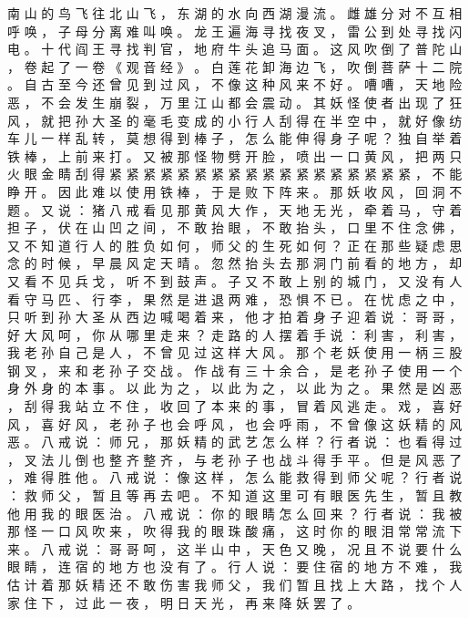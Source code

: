{南 山 的 鸟 飞 往 北 山 飞 ， 东 湖 的 水 向 西 湖 漫 流 。
雌 雄 分 对 不 互 相 呼 唤 ， 子 母 分 离 难 叫 唤 。
龙 王 遍 海 寻 找 夜 叉 ， 雷 公 到 处 寻 找 闪 电 。
十 代 阎 王 寻 找 判 官 ， 地 府 牛 头 追 马 面 。
这 风 吹 倒 了 普 陀 山 ， 卷 起 了 一 卷 《 观 音 经 》 。
白 莲 花 卸 海 边 飞 ， 吹 倒 菩 萨 十 二 院 。
自 古 至 今 还 曾 见 到 过 风 ， 不 像 这 种 风 来 不 好 。
嘈 嘈 ， 天 地 险 恶 ， 不 会 发 生 崩 裂 ， 万 里 江 山 都 会 震 动 。
其 妖 怪 使 者 出 现 了 狂 风 ， 就 把 孙 大 圣 的 毫 毛 变 成 的 小 行 人 刮 得 在 半 空 中 ， 就 好 像 纺 车 儿 一 样 乱 转 ， 莫 想 得 到 棒 子 ， 怎 么 能 伸 得 身 子 呢 ？
独 自 举 着 铁 棒 ， 上 前 来 打 。
又 被 那 怪 物 劈 开 脸 ， 喷 出 一 口 黄 风 ， 把 两 只 火 眼 金 睛 刮 得 紧 紧 紧 紧 紧 紧 紧 紧 紧 紧 紧 紧 紧 紧 紧 紧 紧 紧 ， 不 能 睁 开 。
因 此 难 以 使 用 铁 棒 ， 于 是 败 下 阵 来 。
那 妖 收 风 ， 回 洞 不 题 。
又 说 ： 猪 八 戒 看 见 那 黄 风 大 作 ， 天 地 无 光 ， 牵 着 马 ， 守 着 担 子 ， 伏 在 山 凹 之 间 ， 不 敢 抬 眼 ， 不 敢 抬 头 ， 口 里 不 住 念 佛 ， 又 不 知 道 行 人 的 胜 负 如 何 ， 师 父 的 生 死 如 何 ？
正 在 那 些 疑 虑 思 念 的 时 候 ， 早 晨 风 定 天 晴 。
忽 然 抬 头 去 那 洞 门 前 看 的 地 方 ， 却 又 看 不 见 兵 戈 ， 听 不 到 鼓 声 。
子 又 不 敢 上 别 的 城 门 ， 又 没 有 人 看 守 马 匹 、 行 李 ， 果 然 是 进 退 两 难 ， 恐 惧 不 已 。
在 忧 虑 之 中 ， 只 听 到 孙 大 圣 从 西 边 喊 喝 着 来 ， 他 才 拍 着 身 子 迎 着 说 ： 哥 哥 ， 好 大 风 呵 ， 你 从 哪 里 走 来 ？ 走 路 的 人 摆 着 手 说 ： 利 害 ， 利 害 ， 我 老 孙 自 己 是 人 ， 不 曾 见 过 这 样 大 风 。
那 个 老 妖 使 用 一 柄 三 股 钢 叉 ， 来 和 老 孙 子 交 战 。
作 战 有 三 十 余 合 ， 是 老 孙 子 使 用 一 个 身 外 身 的 本 事 。
以 此 为 之 ， 以 此 为 之 ， 以 此 为 之 。
果 然 是 凶 恶 ， 刮 得 我 站 立 不 住 ， 收 回 了 本 来 的 事 ， 冒 着 风 逃 走 。
戏 ， 喜 好 风 ， 喜 好 风 ， 老 孙 子 也 会 呼 风 ， 也 会 呼 雨 ， 不 曾 像 这 妖 精 的 风 恶 。
八 戒 说 ： 师 兄 ， 那 妖 精 的 武 艺 怎 么 样 ？ 行 者 说 ： 也 看 得 过 ， 叉 法 儿 倒 也 整 齐 整 齐 ， 与 老 孙 子 也 战 斗 得 手 平 。
但 是 风 恶 了 ， 难 得 胜 他 。
八 戒 说 ： 像 这 样 ， 怎 么 能 救 得 到 师 父 呢 ？ 行 者 说 ： 救 师 父 ， 暂 且 等 再 去 吧 。
不 知 道 这 里 可 有 眼 医 先 生 ， 暂 且 教 他 用 我 的 眼 医 治 。
八 戒 说 ： 你 的 眼 睛 怎 么 回 来 ？ 行 者 说 ： 我 被 那 怪 一 口 风 吹 来 ， 吹 得 我 的 眼 珠 酸 痛 ， 这 时 你 的 眼 泪 常 常 流 下 来 。
八 戒 说 ： 哥 哥 呵 ， 这 半 山 中 ， 天 色 又 晚 ， 况 且 不 说 要 什 么 眼 睛 ， 连 宿 的 地 方 也 没 有 了 。
行 人 说 ： 要 住 宿 的 地 方 不 难 ， 我 估 计 着 那 妖 精 还 不 敢 伤 害 我 师 父 ， 我 们 暂 且 找 上 大 路 ， 找 个 人 家 住 下 ， 过 此 一 夜 ， 明 日 天 光 ， 再 来 降 妖 罢 了 。
}
